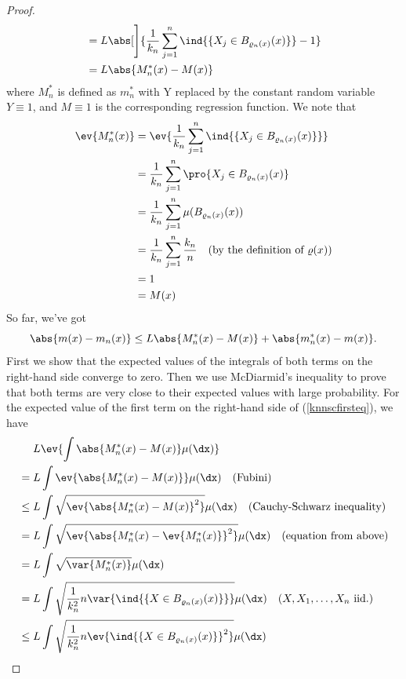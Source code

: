 \begin{proof}
\begin{align*}
        &= L \abs[\Bigg]{\frac{1}{k_n} \sum_{j=1}^n \ind{\{X_j \in B_{\varrho_n(x)}(x)\}} - 1} \\
        &= L\abs{M_n^*(x) - M(x)}
    \end{align*}
    where \(M_n^*\) is defined as \(m_n^*\) with Y replaced by the constant random variable \(Y \equiv 1\), and \(M \equiv 1\) is the corresponding regression function.
    We note that
    \begin{align*}
        \ev{M_n^*(x)}
        &= \ev{\frac{1}{k_n}\sum_{j=1}^n \ind{\{X_j \in B_{\varrho_n(x)}(x)\}}} \\
        &= \frac{1}{k_n} \sum_{j=1}^n \pro{X_j \in B_{\varrho_n(x)}(x)} \\
        &= \frac{1}{k_n} \sum_{j=1}^n \mu(B_{\varrho_n(x)}(x)) \\
        &= \frac{1}{k_n} \sum_{j=1}^n \frac{k_n}{n} \quad (\text{by the definition of} \ \varrho(x))\\
        &= 1 \\
        &= M(x)
    \end{align*}
    So far, we've got
    \begin{equation} \label{knnscfirsteq}
        \abs{m(x) - m_n(x)} \leq L\abs{M_n^*(x) - M(x)} + \abs{m_n^*(x) - m(x)}.
    \end{equation}
    First we show that the expected values of the integrals of both terms on
    the right-hand side converge to zero. Then we use McDiarmid’s inequality
    to prove that both terms are very close to their expected values with large
    probability.
    For the expected value of the first term on the right-hand side of
    (\ref{knnscfirsteq}), we have
    \begin{align*}
        &\quad \ L\ev{\int \abs{M_n^*(x) - M(x)} \mu(\dx)} \\
        &= L \int \ev{\abs{M_n^*(x) - M(x)}} \mu(\dx) \quad \text{(Fubini)}\\
        &\leq L \int \sqrt{\ev{\abs{M_n^*(x) - M(x)}^2}} \mu(\dx) \quad \text{(Cauchy-Schwarz inequality)} \\
        &= L \int \sqrt{\ev{\abs{M_n^*(x) - \ev{M_n^*(x)}}^2}} \mu(\dx) \quad \text{(equation from above)} \\
        &= L \int \sqrt{\var{M_n^*(x)}} \mu(\dx) \\
        &= L \int \sqrt{\frac{1}{k_n^2}n\var{\ind{\{X \in B_{\varrho_n(x)}(x)\}}}} \mu(\dx) \quad (X, X_1, \ldots, X_n \ \text{iid.})\\
        &\leq L \int \sqrt{\frac{1}{k_n^2}n\ev{\ind{\{X \in B_{\varrho_n(x)}(x)\}}^2}} \mu(\dx) \\

\end{align*}
\end{proof}
